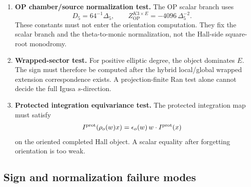 \begin{enumerate}
\item \textbf{OP chamber/source normalization test.}  The OP scalar
branch uses
\[
        D_5=64^{-1}\Delta_5,\qquad
        Z^{K3\times E}_{\mathrm{OP}}
        =
        -4096\,\Delta_5^{-2}.
\]
These constants must not enter the orientation computation.  They fix
the scalar branch and the theta-to-monic normalization, not the
Hall-side square-root monodromy.

\item \textbf{Wrapped-sector test.}  For positive elliptic degree, the
object dominates \(E\).  The sign must therefore be computed after the
hybrid local/global wrapped extension correspondence exists.  A
projection-finite Ran test alone cannot decide the full Igusa
\(s\)-direction.

\item \textbf{Protected integration equivariance test.}  The protected
integration map must satisfy
\[
        I^{\mathrm{prot}}(\rho_o(w)x)
        =
        \epsilon_o(w)\,w\cdot I^{\mathrm{prot}}(x)
\]
on the oriented completed Hall object.  A scalar equality after
forgetting orientation is too weak.
\end{enumerate}

\subsection{Sign and normalization failure modes}

